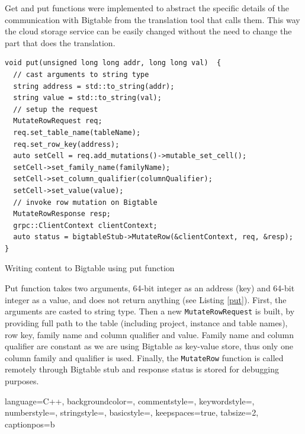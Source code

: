 \documentclass[bsc,frontabs,twoside,singlespacing,parskip,deptreport]{infthesis}     %
\begin{document}
Get and put functions were implemented to abstract the specific details of the communication with Bigtable from the translation tool that calls them. This way the cloud storage service can be easily changed without the need to change the part that does the translation. 

\begin{listing}[H]
\begin{verbatim}
void put(unsigned long long addr, long long val)  {
  // cast arguments to string type
  string address = std::to_string(addr);
  string value = std::to_string(val);
  // setup the request
  MutateRowRequest req;
  req.set_table_name(tableName);
  req.set_row_key(address);
  auto setCell = req.add_mutations()->mutable_set_cell();
  setCell->set_family_name(familyName);
  setCell->set_column_qualifier(columnQualifier);
  setCell->set_value(value);
  // invoke row mutation on Bigtable
  MutateRowResponse resp;
  grpc::ClientContext clientContext;
  auto status = bigtableStub->MutateRow(&clientContext, req, &resp);
}
\end{verbatim}
\caption{Writing content to Bigtable using put function}
\label{put}
\end{listing}

Put function takes two arguments, 64-bit integer as an address (key) and 64-bit integer as a value, and does not return anything (see Listing \ref{put}). First, the arguments are casted to string type. Then a new \texttt{MutateRowRequest} is built, by providing full path to the table (including project, instance and table names), row key, family name and column qualifier and value. Family name and column qualifier are constant as we are using Bigtable as key-value store, thus only one column family and qualifier is used. Finally, the \texttt{MutateRow} function is called remotely through Bigtable stub and response status is stored for debugging purposes.

 {
  language=C++,
  backgroundcolor=\color{backcolour},   
  commentstyle=\color{codegreen},
  keywordstyle=\color{Maroon},
  numberstyle=\tiny\color{codegray},
  stringstyle=\color{magenta},
  basicstyle=\footnotesize,                 
  keepspaces=true,                                           
  tabsize=2,
  captionpos=b
}
\end{document}
